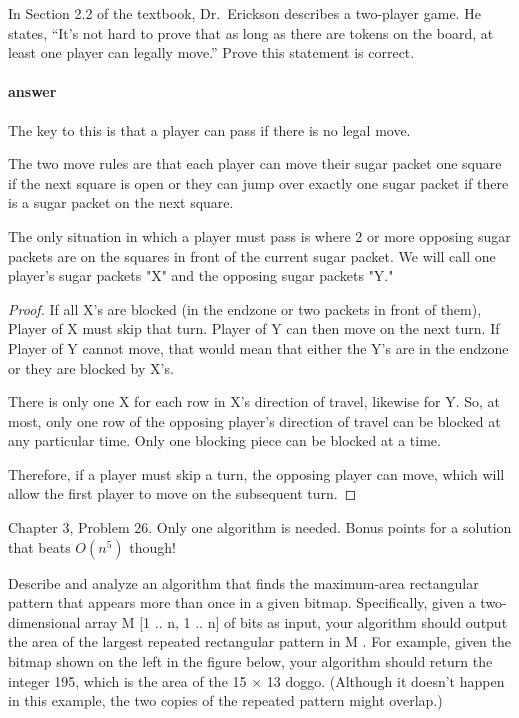 \documentclass{article}
\begin{document}
In Section 2.2 of the textbook, Dr.~Erickson describes a two-player game.
He states, ``It's not hard to prove that
as long as there are tokens on the board, at least one player can legally
move.''  Prove this statement is correct.

\paragraph{answer}
The key to this is that a player can pass if there is no legal move.

The two move rules are that each player can move their sugar packet one square if the next
square is open or they can jump over exactly one sugar packet if there is a sugar packet on
the next square.

The only situation in which a player must pass is where 2 or more opposing sugar packets are on the
squares in front of the current sugar packet. We will call one player's sugar packets "X" and the opposing
sugar packets "Y."

\begin{proof}
    If all X's are blocked (in the endzone or two packets in front of them), Player of X must skip that turn.
    Player of Y can then move on the next turn. If Player of Y cannot move, that would mean that
    either the Y's are in the endzone or they are blocked by X's.

    There is only one X for each row in X's direction of travel, likewise for Y. So, at most, only
    one row of the opposing player's direction of travel can be blocked at any particular time.
    Only one blocking piece can be blocked at a time.

    Therefore, if a player must skip a turn, the opposing player can move, which will allow the first
    player to move on the subsequent turn.
\end{proof}

\collab{}

Chapter 3, Problem 26.  Only one algorithm is needed.  Bonus points for a
solution that beats $O(n^5)$ though!

Describe and analyze an algorithm that finds the maximum-area rectangular
pattern that appears more than once in a given bitmap. Specifically, given
a two-dimensional array M [1 .. n, 1 .. n] of bits as input, your algorithm
should output the area of the largest repeated rectangular pattern in M .
For example, given the bitmap shown on the left in the figure below, your
algorithm should return the integer 195, which is the area of the 15 × 13
doggo. (Although it doesn’t happen in this example, the two copies of the
repeated pattern might overlap.)
\end{document}

